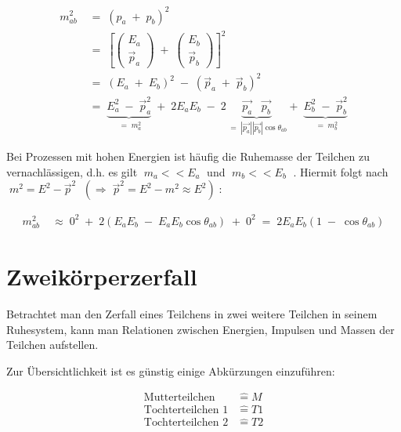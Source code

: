 \documentclass[
a4paper,                                %
twoside,                                %
BCOR1.4cm,                      %
ngerman,                                %
10pt,                           %
headings=normal,                %
headsepline,                    %
clearplainpage, %
final,                                  %
div=14,
parskip=full
]{scrbook}
\begin{document}
\begin{align}
	m_{a b}^{2}
\;&=\;
	\left(
	p_{a}\;+\;p_{b}
	\right)^{2}
\nonumber
\\
\;&=\;
	\left[
		\begin{pmatrix}
			E_{a} \\ \vec{p}_{a}
		\end{pmatrix}
		\;+\;
		\begin{pmatrix}
			E_{b} \\ \vec{p}_{b}
		\end{pmatrix}
	\right]^{2}
\label{loinvzwei}
\\
\;&=\;
	\left(E_{a}\;+\;E_{b}\right)^{2}
	\;-\;
	\left(\vec{p}_{a}\;+\;\vec{p}_{b}\right)^{2}
\nonumber
\\
\;&=\;
	\underbrace{E_{a}^{2}\;-\;\vec{p}_{a}^{2}}_{\;=\;m_{a}^{2}}
	\;+\;
	2 E_{a} E_{b}\;-\;
	2\underbrace{\vec{p_{a}}\;\;\;\vec{p_{b}}}
	_{\;=\;|\vec{p_{a}}| |\vec{p_{b}}| \cos\theta_{ab}}
	+\;
	\underbrace{E_{b}^{2}\;-\;\vec{p}_{b}^{2}}_{\;=\;m_{b}^{2}}
\nonumber
\end{align}

Bei Prozessen mit hohen Energien ist h\"aufig die Ruhemasse der Teilchen zu vernachl\"assigen, d.h. es gilt
$ \;m_{a}<<E_{a}\; $ 
und 
$ \;m_{b}<<E_{b}\; $ 
. Hiermit folgt  nach 
$ \;m^{2}=E^{2}-\vec{p}^2 $ 
$ \;\left(\Rightarrow \;\vec{p}^{2} = E^{2}-m^{2} \approx E^{2}\right)\; $:

\begin{align}
	m_{a b}^{2}
\;&\approx\;
	0^{2}\;+\;
	2\left(
		E_{a} E_{b}\;-\;E_{a} E_{b} \cos\theta_{ab}
	\right)
	\;+\;0^{2}
\;=\;
	2 E_{a} E_{b}
	\left(
		1\;-\;\cos\theta_{ab}
	\right)
\label{inv_ab}
\end{align}

\newpage

\section{Zweik\"orperzerfall}

Betrachtet man den Zerfall eines Teilchens in zwei weitere Teilchen in seinem Ruhesystem, kann man Relationen zwischen Energien, Impulsen und Massen der Teilchen aufstellen.

Zur \"Ubersichtlichkeit ist es g\"unstig einige Abk\"urzungen einzuf\"uhren:

\begin{align}
	\text{Mutterteilchen} &\mathrel{\hat=} M
\nonumber
\\
	\text{Tochterteilchen 1} &\mathrel{\hat=} T1
\nonumber
\\
	\text{Tochterteilchen 2} &\mathrel{\hat=} T2
\nonumber
\end{align}
\end{document}
